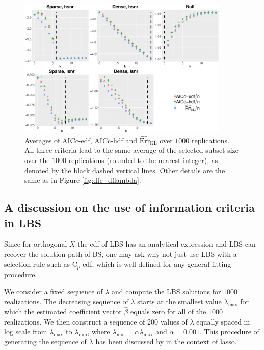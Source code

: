 \begin{figure}[!ht]
	\centering
	\includegraphics[width=0.9\textwidth]{figures/aicc_edf_hdf_kl_bs.eps}
	\caption{Averages of AICc-edf, AICc-hdf and $\widehat{\text{Err}}_\text{KL}$ over $1000$ replications. All three criteria lead to the same average of the selected subset size over the $1000$ replications (rounded to the nearest integer), as denoted by the black dashed vertical lines. Other details are the same as in Figure \ref{fig:dfc_dflambda}.}
	\label{fig:eop_approx_withrss} 
\end{figure}


\subsection{A discussion on the use of information criteria in LBS}
Since for orthogonal $X$ the edf of LBS has an analytical expression and LBS can recover the solution path of BS, one may ask why not just use LBS with a selection rule such as C$_p$-edf, which is well-defined for any general fitting procedure. 

We consider a fixed sequence of $\lambda$ and compute the LBS solutions for $1000$ realizations. The decreasing sequence of $\lambda$ starts at the smallest value $\lambda_{\text{max}}$ for which the estimated coefficient vector $\hat{\beta}$ equals zero for all of the $1000$ realizations. We then construct a sequence of $200$ values of $\lambda$ equally spaced in log scale from $\lambda_{\text{max}}$ to $\lambda_{\text{min}}$, where $\lambda_{\text{min}} = \alpha \lambda_{\text{max}}$ and $\alpha=0.001$. This procedure of generating the sequence of $\lambda$ has been discussed by \citet{Friedman2010} in the context of lasso.


